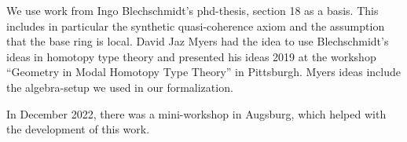 We use work from Ingo Blechschmidt's phd-thesis, section 18 as a basis.
This includes in particular the synthetic quasi-coherence axiom and the assumption that the base ring is local.
David Jaz Myers had the idea to use Blechschmidt's ideas in homotopy type theory
and presented his ideas 2019 at the workshop ``Geometry in Modal Homotopy Type Theory'' in Pittsburgh.
Myers ideas include the algebra-setup we used in our formalization.

In December 2022, there was a mini-workshop in Augsburg, which helped with the development of this work.